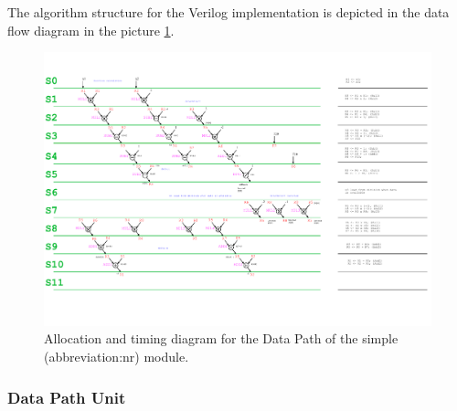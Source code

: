 \documentclass[a4paper, twoside, 11pt]{article}
\newcommand{\fbar}{\FloatBarrier}
\begin{document}
            The algorithm structure for the Verilog implementation is depicted in the data flow diagram in the picture \ref{fig:simple-nr-allocation-timing}.
            \begin{figure}[htbp!]
                \centering
                \includegraphics[width=1\textwidth]{src/pdf/simple-nr-allocation-timing.pdf}
                \caption{Allocation and timing diagram for the Data Path of the simple (\gls{abbreviation:nr}) module.}
                \label{fig:simple-nr-allocation-timing}
            \end{figure}

        \fbar
        \subsubsection{Data Path Unit}
\end{document}
